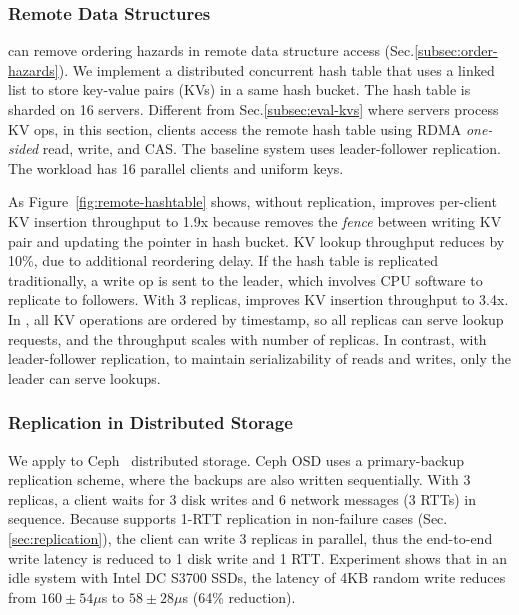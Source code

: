 \subsubsection{Remote Data Structures}
\label{subsec:data-structure}

\sys{} can remove ordering hazards in remote data structure access (Sec.\ref{subsec:order-hazards}).
We implement a distributed concurrent hash table that uses a linked list to store key-value pairs (KVs) in a same hash bucket. The hash table is sharded on 16 servers.
Different from Sec.\ref{subsec:eval-kvs} where servers process KV ops, in this section, clients access the remote hash table using RDMA \emph{one-sided} read, write, and CAS.
The baseline system uses leader-follower replication.
The workload has 16 parallel clients and uniform keys.

As Figure~\ref{fig:remote-hashtable} shows, without replication, \sys{} improves per-client KV insertion throughput to 1.9x because \sys{} removes the \emph{fence} between writing KV pair and updating the pointer in hash bucket.
KV lookup throughput reduces by 10\%, due to additional reordering delay.
If the hash table is replicated traditionally, a write op is sent to the leader, which involves CPU software to replicate to followers.
With 3 replicas, \sys{} improves KV insertion throughput to 3.4x.
In \sys{}, all KV operations are ordered by timestamp, so all replicas can serve lookup requests, and the throughput scales with number of replicas.
In contrast, with leader-follower replication, to maintain serializability of reads and writes, only the leader can serve lookups.


\subsubsection{Replication in Distributed Storage}
\label{subsec:ceph}

We apply \sys{} to Ceph~\cite{weil2006ceph} distributed storage. Ceph OSD uses a primary-backup replication scheme, where the backups are also written sequentially. With 3 replicas, a client waits for 3 disk writes and 6 network messages (3 RTTs) in sequence. Because \sys{} supports 1-RTT replication in non-failure cases (Sec.\ref{sec:replication}), the client can write 3 replicas in parallel, thus the end-to-end write latency is reduced to 1 disk write and 1 RTT. Experiment shows that in an idle system with Intel DC S3700 SSDs, the latency of 4KB random write reduces from $160 \pm 54 \mu$s to $58 \pm 28 \mu$s (64\% reduction).


